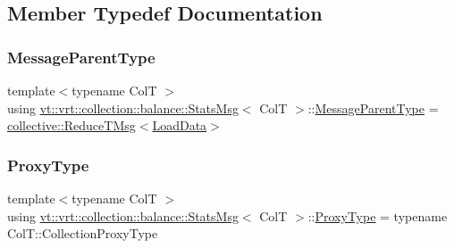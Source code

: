 \subsection{Member Typedef Documentation}
\mbox{\label{structvt_1_1vrt_1_1collection_1_1balance_1_1_stats_msg_aebee389cbc279025a82f4542c9413724}} 
\subsubsection{\texorpdfstring{Message\+Parent\+Type}{MessageParentType}}
{\footnotesize\ttfamily template$<$typename ColT $>$ \\
using \hyperlink{structvt_1_1vrt_1_1collection_1_1balance_1_1_stats_msg}{vt\+::vrt\+::collection\+::balance\+::\+Stats\+Msg}$<$ ColT $>$\+::\hyperlink{structvt_1_1collective_1_1reduce_1_1operators_1_1_reduce_t_msg_a0dd12197060e03bb7e73dbe299044f22}{Message\+Parent\+Type} =  \hyperlink{namespacevt_1_1collective_a28b82d5d48c9bc6e4fd738fcbf9e0f62}{collective\+::\+Reduce\+T\+Msg}$<$\hyperlink{structvt_1_1vrt_1_1collection_1_1balance_1_1_load_data}{Load\+Data}$>$}

\mbox{\label{structvt_1_1vrt_1_1collection_1_1balance_1_1_stats_msg_a6f88a58947e0a02b3f7dcfec8b91b5fd}} 
\subsubsection{\texorpdfstring{Proxy\+Type}{ProxyType}}
{\footnotesize\ttfamily template$<$typename ColT $>$ \\
using \hyperlink{structvt_1_1vrt_1_1collection_1_1balance_1_1_stats_msg}{vt\+::vrt\+::collection\+::balance\+::\+Stats\+Msg}$<$ ColT $>$\+::\hyperlink{structvt_1_1vrt_1_1collection_1_1balance_1_1_stats_msg_a6f88a58947e0a02b3f7dcfec8b91b5fd}{Proxy\+Type} =  typename Col\+T\+::\+Collection\+Proxy\+Type}



